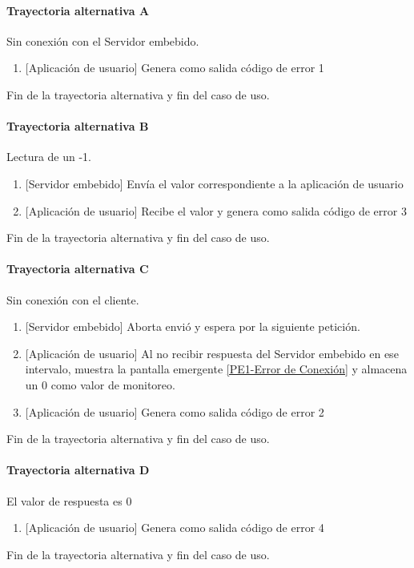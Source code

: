 \paragraph{Trayectoria alternativa A} \label{SUB-U-CU1.8:TA}
	Sin conexión con el Servidor embebido.
	\begin{enumerate}[label=A\arabic*.]
		\item {[Aplicación de usuario]} Genera como salida código de error 1
	\end{enumerate}
	Fin de la trayectoria alternativa y fin del caso de uso.

\paragraph{Trayectoria alternativa B} \label{SUB-U-CU1.8:TB}
	Lectura de un -1.
	\begin{enumerate}[label=B\arabic*.]
		\item {[Servidor embebido]} Envía el valor correspondiente a la aplicación de usuario
		\item {[Aplicación de usuario]} Recibe el valor y genera como salida código de error 3
	\end{enumerate}
	Fin de la trayectoria alternativa y fin del caso de uso.

\paragraph{Trayectoria alternativa C} \label{SUB-U-CU1.8:TC}
	Sin conexión con el cliente.
	\begin{enumerate}[label=C\arabic*.]
		\item {[Servidor embebido]} Aborta envió y espera por la siguiente petición.
		\item {[Aplicación de usuario]} Al no recibir respuesta del Servidor embebido en ese intervalo, muestra la pantalla emergente \hyperref[fig:Error de Conexion]{[PE1-Error de Conexión]} y almacena un 0 como valor de monitoreo.
		\item {[Aplicación de usuario]} Genera como salida código de error 2
	\end{enumerate}
	Fin de la trayectoria alternativa y fin del caso de uso.
	
\paragraph{Trayectoria alternativa D} \label{SUB-U-CU1.8:TD}
	El valor de respuesta es 0
	\begin{enumerate}[label=D\arabic*.]
		\item {[Aplicación de usuario]} Genera como salida código de error 4
	\end{enumerate}
	Fin de la trayectoria alternativa y fin del caso de uso.


